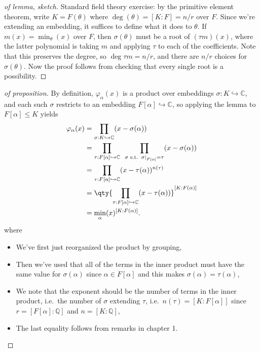 \begin{proof}[of lemma, sketch]

Standard field theory exercise: by the primitive element theorem, write
\(K = F( \theta)\) where \(\deg( \theta) = [K: F] = n/r\) over \(F\).
Since we're extending an embedding, it suffices to define what it does
to \(\theta\). If \(m(x) = \min_{ \theta}(x)\) over \(F\), then
\(\sigma( \theta)\) must be a root of \((\tau m)(x)\), where the latter
polynomial is taking \(m\) and applying \(\tau\) to each of the
coefficients. Note that this preserves the degree, so
\(\deg \tau m = n/r\), and there are \(n/r\) choices for
\(\sigma( \theta)\). Now the proof follows from checking that every
single root is a possibility.

\end{proof}

\begin{proof}[of proposition]

By definition, \(\varphi_{ \alpha}(x)\) is a product over embeddings
\(\sigma:K \hookrightarrow{\mathbb{C}}\), and each such \(\sigma\)
restricts to an embedding \(F[ \alpha] \hookrightarrow{\mathbb{C}}\), so
applying the lemma to \(F[ \alpha] \leq K\) yields
\begin{align*}
\varphi_{ \alpha}(x) 
&= \prod_{ \sigma: K\hookrightarrow{\mathbb{C}}} (x - \sigma( \alpha) ) \\
&= \prod_{ \tau: F[ \alpha] \hookrightarrow{\mathbb{C}}} \,\,\, \prod_{ \sigma \text{ s.t. } { \left.{{ \sigma}} \right|_{{ F[ \alpha ] }} } = \tau } (x - \sigma( \alpha) ) \\
&= \prod_{ \tau: F[ \alpha ] \hookrightarrow{\mathbb{C}}} (x - \tau( \alpha ) )^{n(\tau)} \\
&= \qty{ \prod_{ \tau: F[ \alpha] \hookrightarrow{\mathbb{C}}} (x - \tau( \alpha ) ) }^{[K: F(\alpha)]} \\
&= \min_ \alpha(x) ^{[ K : F( \alpha ) ] }
.\end{align*}
where

\begin{itemize}
\tightlist
\item
  We've first just reorganized the product by grouping,
\item
  Then we've used that all of the terms in the inner product must have
  the same value for \(\sigma( \alpha)\) since \(\alpha\in F[ \alpha]\)
  and this makes \(\sigma( \alpha) = \tau( \alpha)\),
\item
  We note that the exponent should be the number of terms in the inner
  product, i.e.~the number of \(\sigma\) extending \(\tau\),
  i.e.~\(n(\tau) = [K: F[ \alpha] ]\) since
  \(r = [F[ \alpha] : {\mathbb{Q}}]\) and \(n = [K: {\mathbb{Q}}]\),
\item
  The last equality follows from remarks in chapter 1.
\end{itemize}

\end{proof}

